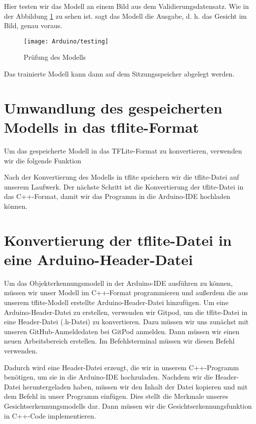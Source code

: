 Hier testen wir das Modell an einem Bild aus dem Validierungsdatensatz. Wie in der Abbildung \ref{GoogleColabTesting} zu sehen ist. sagt das Modell die Ausgabe, d. h. das Gesicht im Bild, genau voraus.

\begin{figure}[H]
	\centering
	\texttt{[image: Arduino/testing]}
	\caption{Prüfung des Modells}
	\label{GoogleColabTesting}
\end{figure}

Das trainierte Modell kann dann auf dem Sitzungsspeicher abgelegt werden.

\section{Umwandlung des gespeicherten Modells in das tflite-Format}

Um das gespeicherte Modell in das TFLite-Format zu konvertieren, verwenden wir die folgende Funktion 

Nach der Konvertierung des Modells in tflite speichern wir die tflite-Datei auf unserem Laufwerk. Der nächste Schritt ist die Konvertierung der tflite-Datei in das C++-Format, damit wir das Programm in die Arduino-IDE hochladen können.

\section{Konvertierung der tflite-Datei in eine Arduino-Header-Datei}

Um das Objekterkennungsmodell in der Arduino-IDE ausführen zu können, müssen wir unser Modell im C++-Format programmieren und außerdem die aus unserem tflite-Modell erstellte Arduino-Header-Datei hinzufügen. Um eine Arduino-Header-Datei zu erstellen, verwenden wir Gitpod, um die tflite-Datei in eine Header-Datei (.h-Datei) zu konvertieren. Dazu müssen wir uns zunächst mit unseren GitHub-Anmeldedaten bei GitPod anmelden. Dann müssen wir einen neuen Arbeitsbereich erstellen. Im Befehlsterminal müssen wir diesen Befehl  verwenden.

Dadurch wird eine Header-Datei erzeugt, die wir in unserem C++-Programm benötigen, um sie in die Arduino-IDE hochzuladen. Nachdem wir die Header-Datei heruntergeladen haben, müssen wir den Inhalt der Datei kopieren und mit dem Befehl  in unser Programm einfügen. Dies stellt die Merkmale unseres Gesichtserkennungsmodells dar. Dann müssen wir die Gesichtserkennungsfunktion in C++-Code implementieren.

